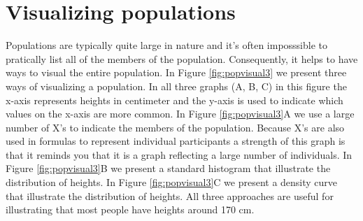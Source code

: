 \documentclass[
]{krantz}
\begin{document}
\hypertarget{visualizing-populations}{%
\section{Visualizing populations}\label{visualizing-populations}}

Populations are typically quite large in nature and it's often imposssible to pratically list all of the members of the population. Consequently, it helps to have ways to visual the entire population. In Figure \ref{fig:popvisual3} we present three ways of visualizing a population. In all three graphs (A, B, C) in this figure the x-axis represents heights in centimeter and the y-axis is used to indicate which values on the x-axis are more common. In Figure \ref{fig:popvisual3}A we use a large number of X's to indicate the members of the population. Because X's are also used in formulas to represent individual participants a strength of this graph is that it reminds you that it is a graph reflecting a large number of individuals. In Figure \ref{fig:popvisual3}B we present a standard histogram that illustrate the distribution of heights. In Figure \ref{fig:popvisual3}C we present a density curve that illustrate the distribution of heights. All three approaches are useful for illustrating that most people have heights around 170 cm.
\end{document}
